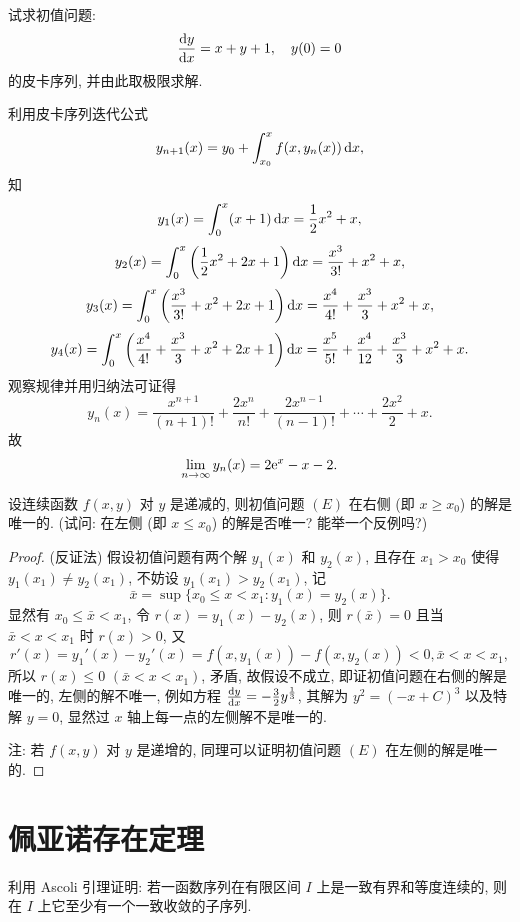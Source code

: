 \begin{exercise}
  试求初值问题:
  \[\frac{\mathop{}\!\mathrm{d} y}{\mathop{}\!\mathrm{d} x}=x+y+1,\quad y(0)=0\]
  的皮卡序列, 并由此取极限求解.
\end{exercise}

\begin{solution}
  利用皮卡序列迭代公式
  \[y_{n+1}(x)=y_0+\int_{x_0}^xf(x,y_n(x))\mathop{}\!\mathrm{d} x,\]
  知
  \[y_1(x)=\int_0^x(x+1)\mathop{}\!\mathrm{d} x=\frac{1}{2}x^2+x,\]
  \[y_2(x)=\int_0^x\left(\frac{1}{2}x^2+2x+1\right)\mathop{}\!\mathrm{d} x=\frac{x^3}{3!}+x^2+x,\]
  \[y_3(x)=\int_0^x\left(\frac{x^3}{3!}+x^2+2x+1\right)\mathop{}\!\mathrm{d} x=\frac{x^4}{4!}+\frac{x^3}{3}+x^2+x,\]
  \[y_4(x)=\int_0^x\left(\frac{x^4}{4!}+\frac{x^3}{3}+x^2+2x+1\right)\mathop{}\!\mathrm{d} x
    =\frac{x^5}{5!}+\frac{x^4}{12}+\frac{x^3}{3}+x^2+x.\]
  观察规律并用归纳法可证得
  \[y_n(x)=\frac{x^{n+1}}{(n+1)!}+\frac{2x^n}{n!}+\frac{2x^{n-1}}{(n-1)!}+\cdots+\frac{2x^2}{2}+x.\]
  故
  \[\lim_{n\to\infty}y_n(x)=2\mathrm{e}^x-x-2.\qedhere\]
\end{solution}



\begin{exercise}
  设连续函数 $f(x,y)$ 对 $y$ 是递减的, 则初值问题 $(E)$ 在右侧
  (即 $x\geq x_0$) 的解是唯一的. (试问: 在左侧 (即 $x\leq x_0$) 的解是否唯一? 能举一个反例吗?)
\end{exercise}

\begin{proof}
  (反证法) 假设初值问题有两个解 $y_1(x)$ 和 $y_2(x)$,
  且存在 $x_1>x_0$ 使得 $y_1(x_1)\neq y_2(x_1)$, 不妨设 $y_1(x_1)>y_2(x_1)$, 记
  \[\bar{x}=\sup\{x_0\leq x<x_1:y_1(x)=y_2(x)\}.\]
  显然有 $x_0\leq\bar{x}<x_1$, 令 $r(x)=y_1(x)-y_2(x)$,
  则 $r(\bar{x})=0$ 且当 $\bar{x}<x<x_1$ 时 $r(x)>0$, 又
  \[r'(x)=y_1'(x)-y_2'(x)=f(x,y_1(x))-f(x,y_2(x))<0,\bar{x}<x<x_1,\]
  所以 $r(x)\leq 0$ $(\bar{x}<x<x_1)$, 矛盾, 故假设不成立,
  即证初值问题在右侧的解是唯一的, 左侧的解不唯一, 
  例如方程 $\frac{\mathop{}\!\mathrm{d} y}{\mathop{}\!\mathrm{d} x}=-\frac{3}{2}y^{\frac{1}{3}}$,
  其解为 $y^2=(-x+C)^3$ 以及特解 $y=0$, 显然过 $x$ 轴上每一点的左侧解不是唯一的.

  注: 若 $f(x,y)$ 对 $y$ 是递增的, 同理可以证明初值问题 $(E)$ 在左侧的解是唯一的.
\end{proof}



\section{佩亚诺存在定理}



\begin{exercise}
  利用 Ascoli 引理证明: 若一函数序列在有限区间 $I$ 上是一致有界和等度连续的, 则在 $I$ 上它至少有一个一致收敛的子序列.
\end{exercise}

